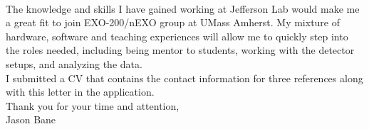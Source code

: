 \documentclass[12pt,letterpaper]{article}
\begin{document}
\paragraph{}The knowledge and skills I have gained working at Jefferson Lab would make me a great fit to join EXO-200/nEXO group at UMass Amherst. My mixture of hardware, software and teaching experiences will allow me to quickly step into the roles needed, including being mentor to students, working with the detector setups, and analyzing the data.      
\\

I submitted a CV that contains the contact information for three references along with this letter in the application. 
\\

\noindent Thank you for your time and attention,\\
\noindent Jason Bane
\end{document}
